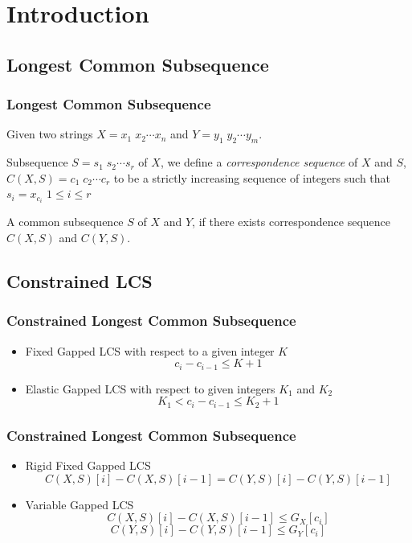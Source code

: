 \section{Introduction}

\subsection{Longest Common Subsequence}
\begin{frame}
    \frametitle{Longest Common Subsequence}
    Given two strings $X = x_1 \; x_2 \cdots x_n$ and $Y = y_1 \; y_2 \cdots y_m$.
    \begin{definition}
    	Subsequence $S = s_1 \; s_2 \cdots s_r$ of $X$, we define a 
    	\emph{correspondence sequence} of $X$ and $S$, $C(X, S) = c_1 \; c_2 \cdots c_r$ 
    	to be a strictly increasing sequence of integers such that 
    	$s_i = x_{c_i}$ $1 \le i \le r$
	\end{definition}
	\begin{definition}
		A common subsequence $S$ of $X$ and $Y$, if there exists correspondence sequence
		$C(X, S)$ and $C(Y, S)$.
	\end{definition}
\end{frame}

\subsection{Constrained LCS}
\begin{frame}
    \frametitle{Constrained Longest Common Subsequence}
    \begin{itemize}
    	\item Fixed Gapped LCS with respect to a given integer $K$
    		$$c_i - c_{i-1} \le K+1$$
    	\item Elastic Gapped LCS with respect to given integers $K_1$ and $K_2$
    		$$K_1 < c_i - c_{i-1} \le K_2 + 1$$
    \end{itemize}
\end{frame}

\begin{frame}
    \frametitle{Constrained Longest Common Subsequence}
    \begin{itemize}
        \item Rigid Fixed Gapped LCS
            $$C(X, S)[i] - C(X, S)[i-1] = C(Y, S)[i] - C(Y, S)[i-1]$$
        \item Variable Gapped LCS
            $$C(X, S)[i] - C(X, S)[i-1] \le G_{X}[c_i]$$
            $$C(Y, S)[i] - C(Y, S)[i-1] \le G_{Y}[c_i]$$
    \end{itemize}
\end{frame}

